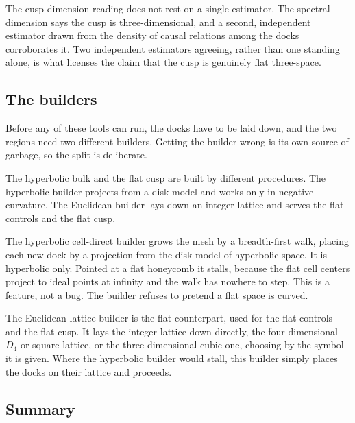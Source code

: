 The cusp dimension reading does not rest on a single estimator. The spectral dimension says the cusp is three-dimensional, and a second, independent estimator drawn from the density of causal relations among the docks corroborates it. Two independent estimators agreeing, rather than one standing alone, is what licenses the claim that the cusp is genuinely flat three-space.

\subsection{The builders}

Before any of these tools can run, the docks have to be laid down, and the two regions need two different builders. Getting the builder wrong is its own source of garbage, so the split is deliberate.

\begin{principle}
The hyperbolic bulk and the flat cusp are built by different procedures. The hyperbolic builder projects from a disk model and works only in negative curvature. The Euclidean builder lays down an integer lattice and serves the flat controls and the flat cusp.
\end{principle}

The hyperbolic cell-direct builder grows the mesh by a breadth-first walk, placing each new dock by a projection from the disk model of hyperbolic space. It is hyperbolic only. Pointed at a flat honeycomb it stalls, because the flat cell centers project to ideal points at infinity and the walk has nowhere to step. This is a feature, not a bug. The builder refuses to pretend a flat space is curved.

The Euclidean-lattice builder is the flat counterpart, used for the flat controls and the flat cusp. It lays the integer lattice down directly, the four-dimensional $D_4$ or square lattice, or the three-dimensional cubic one, choosing by the symbol it is given. Where the hyperbolic builder would stall, this builder simply places the docks on their lattice and proceeds.

\subsection{Summary}

